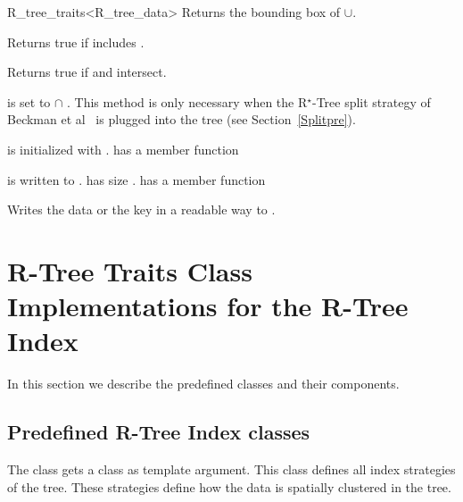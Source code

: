 \begin{ccClassTemplate}{R_tree_traits<R_tree_data>}
{Returns the bounding box of  $\cup $.}

{Returns true if  includes .}

{Returns true if   and  intersect.}

{ is set to   $\cap$ . This method is only
  necessary when the R$^\star$-Tree split strategy of Beckman et
  al~\cite{bkss-rtera-90} is plugged into the tree (see
  Section~\ref{Splitpre}).}


{ is initialized with .
\ccPrecond {} has a member function }

{ is written to .  has size .
\ccPrecond {} has a member function }

{Writes the data or the key in a readable way to .}

\end{ccClassTemplate}


\section{R-Tree Traits Class Implementations for the R-Tree
  Index}
In this section we describe the predefined 
classes and their components.

\subsection{Predefined R-Tree Index classes}
\label{preindex}
The  class gets a  class as
template argument. This class defines all index strategies of the 
tree. These strategies  define how the data is spatially clustered in
the tree.
